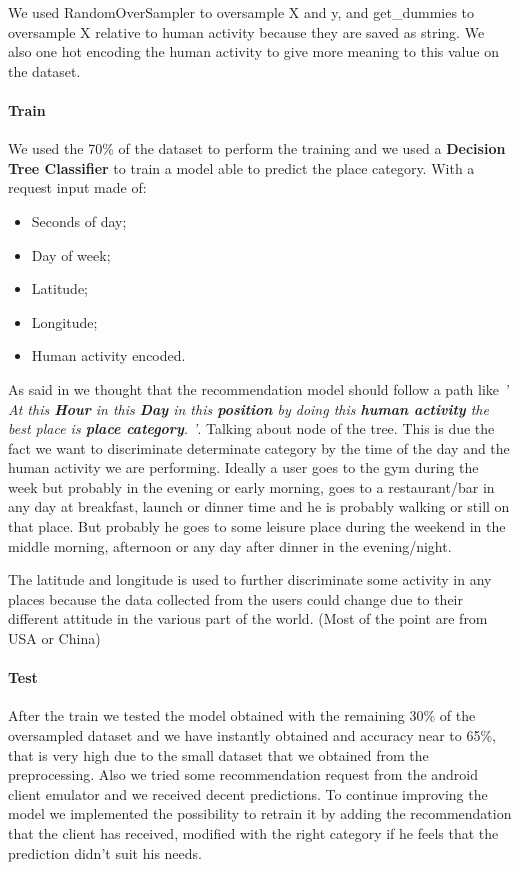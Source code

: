 \documentclass[../../main]{subfiles}
\begin{document}
We used RandomOverSampler to oversample X and y, and get\_dummies to oversample X relative to human activity
because they are saved as string. We also one hot encoding the human activity to give more meaning to this value on the dataset.

\paragraph*{Train}
We used the 70\% of the dataset to perform the training and we used a \textbf{Decision Tree Classifier} to train a model able to
predict the place category. 
With a request input made of:
\begin{itemize}
    \item Seconds of day;
    \item Day of week;
    \item Latitude;
    \item Longitude;
    \item Human activity encoded.
\end{itemize}
As said in  we thought that the recommendation model should follow a path like \textit{' At this \textbf{Hour} in this \textbf{Day} in this \textbf{position} by doing this \textbf{human activity} the best place is \textbf{place category}. '}.
Talking about node of the tree. This is due the fact we want to discriminate determinate category by the time of the day and the human activity we are performing.
Ideally a user goes to the gym during the week but probably in the evening or early morning, 
goes to a restaurant/bar in any day at breakfast, launch or dinner time and he is probably walking or still on that place.
But probably he goes to some leisure place during the weekend in the middle morning, afternoon or any day after dinner in the evening/night.

The latitude and longitude is used to further discriminate some activity in any places because the data collected from the users could change due to their different attitude in the various part of the world.
(Most of the point are from USA or China)
\paragraph*{Test}
After the train we tested the model obtained with the remaining 30\% of the oversampled dataset and we have instantly obtained and accuracy near to 65\%, that is very high due to the small dataset that we obtained from the preprocessing.
Also we tried some recommendation request from the android client emulator and we received decent predictions. To continue improving the model we implemented the possibility to retrain it by adding the recommendation that the client has received, modified with the right category if he feels that the prediction didn't suit his needs. 
\end{document}
